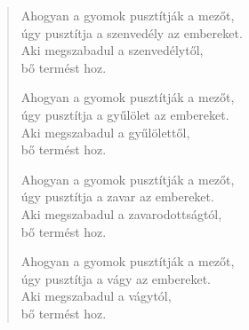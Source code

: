 \begin{verse}
 Ahogyan a gyomok pusztítják a mezőt,\\
úgy pusztítja a szenvedély az embereket.\\
Aki megszabadul a szenvedélytől,\\
bő termést hoz.

 Ahogyan a gyomok pusztítják a mezőt,\\
úgy pusztítja a gyűlölet az embereket.\\
Aki megszabadul a gyűlölettől,\\
bő termést hoz.

 Ahogyan a gyomok pusztítják a mezőt,\\
úgy pusztítja a zavar az embereket.\\
Aki megszabadul a zavarodottságtól,\\
bő termést hoz.

 Ahogyan a gyomok pusztítják a mezőt,\\
úgy pusztítja a vágy az embereket.\\
Aki megszabadul a vágytól,\\
bő termést hoz.

\end{verse}
